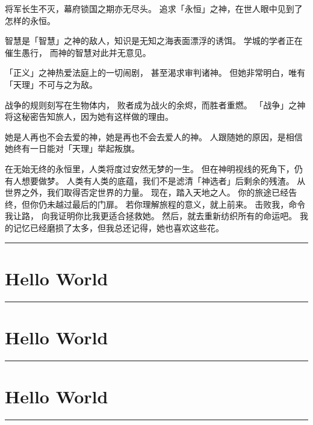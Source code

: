 \documentclass[a4paper,11pt]{article}
\begin{document}
\begin{tcolorbox}[arc=0pt,colback=white,colframe=white,boxsep=0pt,boxrule=0pt,width=\textwidth,height=\textheight-9em-1.5em,top=0pt,bottom=1pt,left=0pt,right=0pt]
\begin{minipage}[b][\textheight-9.5em][t]{31em}
\begin{multicols}{2}
			将军长生不灭，幕府锁国之期亦无尽头。
			追求「永恒」之神，在世人眼中见到了怎样的永恒。\par
			智慧是「智慧」之神的敌人，知识是无知之海表面漂浮的诱饵。
			学城的学者正在催生愚行，
			而神的智慧对此并无意见。\par
			「正义」之神热爱法庭上的一切闹剧，
			甚至渴求审判诸神。
			但她非常明白，唯有「天理」不可与之为敌。\par
			战争的规则刻写在生物体内，
			败者成为战火的余烬，而胜者重燃。
			「战争」之神将这秘密告知旅人，因为她有这样做的理由。\par
			她是人再也不会去爱的神，她是再也不会去爱人的神。
			人跟随她的原因，是相信她终有一日能对「天理」举起叛旗。\par
			在无始无终的永恒里，人类将度过安然无梦的一生。
			但在神明视线的死角下，仍有人想要做梦。
			人类有人类的底蕴，我们不是滤清「神选者」后剩余的残渣。
			从世界之外，我们取得否定世界的力量。
			现在，踏入天地之人。
			你的旅途已经告终，但你仍未越过最后的门扉。
			若你理解旅程的意义，就上前来。
			击败我，命令我让路，
			向我证明你比我更适合拯救她。
			然后，就去重新纺织所有的命运吧。
			我的记忆已经磨损了太多，但我总还记得，她也喜欢这些花。\par
			\vspace{1em}\hspace{1pt}
		\end{multicols}\par
        \vskip 1pt
	\end{minipage}\hfill\rule{1pt}{\textheight-9.5em}\hfill
	\begin{minipage}[b][\textheight-9.5em][t]{13em}
		\section*{Hello World}
		\lipsum[1-2][1-6]\par
		\vskip 5pt\vfill\hrule\vskip 5pt\vfill
		\section*{Hello World}
		\lipsum[1-2][1-6]\par
		\vskip 5pt\vfill\hrule\vskip 5pt\vfill
		\section*{Hello World}
		\lipsum[1-2][1-6]\par
		\vskip 5pt\vfill
	\end{minipage}\par
\end{tcolorbox}\par\vfill
\rule{\linewidth}{1pt}
\end{document}

